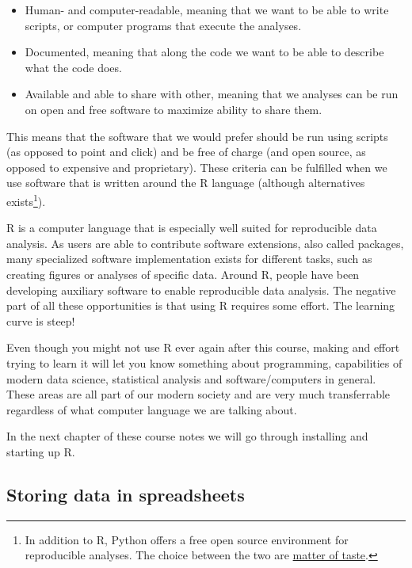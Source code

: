 \documentclass[
]{article}
\providecommand{\tightlist}{%
  \setlength{\itemsep}{0pt}\setlength{\parskip}{0pt}}
\begin{document}
\begin{itemize}
\tightlist
\item
  Human- and computer-readable, meaning that we want to be able to write scripts, or computer programs that execute the analyses.
\item
  Documented, meaning that along the code we want to be able to describe what the code does.
\item
  Available and able to share with other, meaning that we analyses can be run on open and free software to maximize ability to share them.
\end{itemize}

This means that the software that we would prefer should be run using scripts (as opposed to point and click) and be free of charge (and open source, as opposed to expensive and proprietary). These criteria can be fulfilled when we use software that is written around the R language (although alternatives exists\footnote{In addition to R, Python offers a free open source environment for reproducible analyses. The choice between the two are \href{https://www.datacamp.com/community/tutorials/r-or-python-for-data-analysis}{matter of taste}.}).

R is a computer language that is especially well suited for reproducible data analysis. As users are able to contribute software extensions, also called packages, many specialized software implementation exists for different tasks, such as creating figures or analyses of specific data. Around R, people have been developing auxiliary software to enable reproducible data analysis. The negative part of all these opportunities is that using R requires some effort. The learning curve is steep!

Even though you might not use R ever again after this course, making and effort trying to learn it will let you know something about programming, capabilities of modern data science, statistical analysis and software/computers in general. These areas are all part of our modern society and are very much transferrable regardless of what computer language we are talking about.

In the next chapter of these course notes we will go through installing and starting up R.

\hypertarget{storing-data-in-spreadsheets}{%
\subsection{Storing data in spreadsheets}\label{storing-data-in-spreadsheets}}
\end{document}
